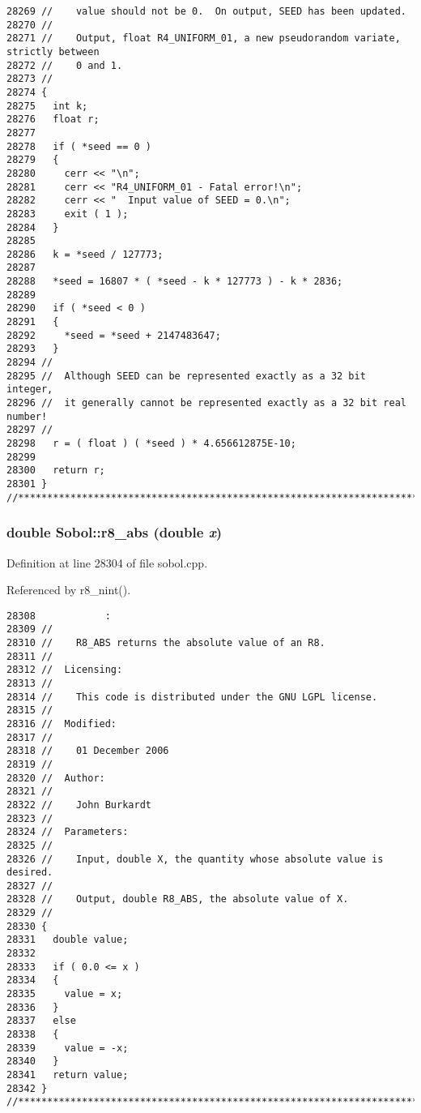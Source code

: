 \begin{Code}
\begin{verbatim}
28269 //    value should not be 0.  On output, SEED has been updated.
28270 //
28271 //    Output, float R4_UNIFORM_01, a new pseudorandom variate, strictly between
28272 //    0 and 1.
28273 //
28274 {
28275   int k;
28276   float r;
28277 
28278   if ( *seed == 0 )
28279   {
28280     cerr << "\n";
28281     cerr << "R4_UNIFORM_01 - Fatal error!\n";
28282     cerr << "  Input value of SEED = 0.\n";
28283     exit ( 1 );
28284   }
28285 
28286   k = *seed / 127773;
28287 
28288   *seed = 16807 * ( *seed - k * 127773 ) - k * 2836;
28289 
28290   if ( *seed < 0 )
28291   {
28292     *seed = *seed + 2147483647;
28293   }
28294 //
28295 //  Although SEED can be represented exactly as a 32 bit integer,
28296 //  it generally cannot be represented exactly as a 32 bit real number!
28297 //
28298   r = ( float ) ( *seed ) * 4.656612875E-10;
28299 
28300   return r;
28301 }
//****************************************************************************80
\end{verbatim}
\end{Code}


\subsubsection{\setlength{\rightskip}{0pt plus 5cm}double Sobol::r8\_\-abs (double {\em x})}\label{namespaceSobol_f258a02f26da6f7c0c63c0fd9385ee9c}




Definition at line 28304 of file sobol.cpp.

Referenced by r8\_\-nint().

\begin{Code}\begin{verbatim}28308            :
28309 //
28310 //    R8_ABS returns the absolute value of an R8.
28311 //
28312 //  Licensing:
28313 //
28314 //    This code is distributed under the GNU LGPL license. 
28315 //
28316 //  Modified:
28317 //
28318 //    01 December 2006
28319 //
28320 //  Author:
28321 //
28322 //    John Burkardt
28323 //
28324 //  Parameters:
28325 //
28326 //    Input, double X, the quantity whose absolute value is desired.
28327 //
28328 //    Output, double R8_ABS, the absolute value of X.
28329 //
28330 {
28331   double value;
28332 
28333   if ( 0.0 <= x )
28334   {
28335     value = x;
28336   } 
28337   else
28338   {
28339     value = -x;
28340   }
28341   return value;
28342 }
//****************************************************************************80
\end{verbatim}
\end{Code}



